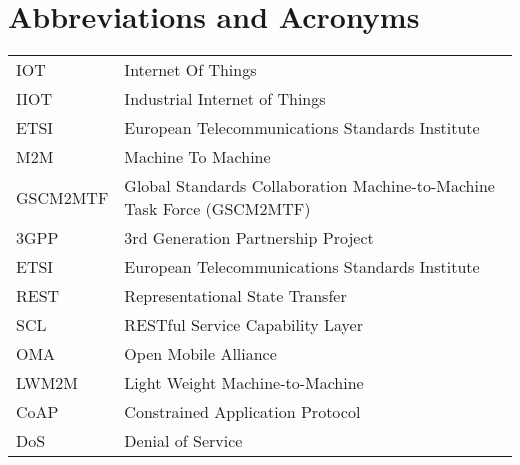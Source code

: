 \chapter*{Abbreviations and Acronyms}


\noindent
\begin{longtable}{@{}p{}p{}@{}}
IOT & Internet Of Things \\
IIOT & Industrial Internet of Things \\
ETSI & European Telecommunications Standards Institute \\
M2M & Machine To Machine \\
GSCM2MTF & Global Standards Collaboration Machine-to-Machine Task Force (GSCM2MTF) \\
3GPP & 3rd Generation Partnership Project \\ 
ETSI & European Telecommunications Standards Institute \\
REST & Representational State Transfer \\
SCL & RESTful Service Capability Layer \\
OMA & Open Mobile Alliance \\
LWM2M & Light Weight Machine-to-Machine \\
CoAP & Constrained Application Protocol \\
DoS & Denial of Service \\  

\end{longtable}
